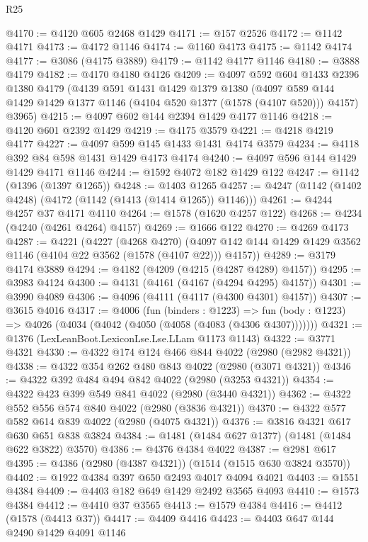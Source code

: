 \begin{lexlean}{R25}
\begin{coremodule}
@4170 := @4120 @605 @2468 @1429
@4171 := @157 @2526
@4172 := @1142 @4171
@4173 := @4172 @1146
@4174 := @1160 @4173
@4175 := @1142 @4174
@4177 := @3086 (@4175 @3889)
@4179 := @1142 @4177 @1146
@4180 := @3888 @4179
@4182 := @4170 @4180 @4126
@4209 := @4097
    @592
    @604
    @1433
    @2396
    @1380
    @4179
    (@4139
      @591
      @1431
      @1429
      @1379
      @1380
      (@4097 @589 @144 @1429 @1429 @1377 @1146 (@4104 @520 @1377 (@1578 (@4107 @520))) @4157)
      @3965)
@4215 := @4097 @602 @144 @2394 @1429 @4177 @1146
@4218 := @4120 @601 @2392 @1429
@4219 := @4175 @3579
@4221 := @4218 @4219 @4177
@4227 := @4097 @599 @145 @1433 @1431 @4174 @3579
@4234 := @4118 @392 @84 @598 @1431 @1429 @4173 @4174
@4240 := @4097 @596 @144 @1429 @1429 @4171 @1146
@4244 := @1592 @4072 @182 @1429 @122
@4247 := @1142 (@1396 (@1397 @1265))
@4248 := @1403 @1265
@4257 := @4247 (@1142 (@1402 @4248) (@4172 (@1142 (@1413 (@1414 @1265)) @1146)))
@4261 := @4244 @4257 @37 @4171 @4110
@4264 := @1578 (@1620 @4257 @122)
@4268 := @4234 (@4240 (@4261 @4264) @4157)
@4269 := @1666 @122
@4270 := @4269 @4173
@4287 := @4221
    (@4227
      (@4268 @4270)
      (@4097 @142 @144 @1429 @1429 @3562 @1146 (@4104 @22 @3562 (@1578 (@4107 @22))) @4157))
@4289 := @3179 @4174 @3889
@4294 := @4182 (@4209 (@4215 (@4287 @4289) @4157))
@4295 := @3983 @4124
@4300 := @4131 (@4161 (@4167 (@4294 @4295) @4157))
@4301 := @3990 @4089
@4306 := @4096 (@4111 (@4117 (@4300 @4301) @4157))
@4307 := @3615 @4016
@4317 := @4006
    (fun (binders : @1223) =>
    fun (body : @1223) => @4026 (@4034 (@4042 (@4050 (@4058 (@4083 (@4306 @4307)))))))
@4321 := @1376 (LexLeanBoot.LexiconLse.Lse.LLam @1173 @1143)
@4322 := @3771 @4321
@4330 := @4322 @174 @124 @466 @844 @4022 (@2980 (@2982 @4321))
@4338 := @4322 @354 @262 @480 @843 @4022 (@2980 (@3071 @4321))
@4346 := @4322 @392 @484 @494 @842 @4022 (@2980 (@3253 @4321))
@4354 := @4322 @423 @399 @549 @841 @4022 (@2980 (@3440 @4321))
@4362 := @4322 @552 @556 @574 @840 @4022 (@2980 (@3836 @4321))
@4370 := @4322 @577 @582 @614 @839 @4022 (@2980 (@4075 @4321))
@4376 := @3816 @4321 @617 @630 @651 @838 @3824
@4384 := @1481 (@1484 @627 @1377) (@1481 (@1484 @622 @3822) @3570)
@4386 := @4376 @4384 @4022
@4387 := @2981 @617
@4395 := @4386 (@2980 (@4387 @4321)) (@1514 (@1515 @630 @3824 @3570))
@4402 := @1922 @4384 @397 @650 @2493 @4017 @4094 @4021
@4403 := @1551 @4384
@4409 := @4403 @182 @649 @1429 @2492 @3565 @4093
@4410 := @1573 @4384
@4412 := @4410 @37 @3565
@4413 := @1579 @4384
@4416 := @4412 (@1578 (@4413 @37))
@4417 := @4409 @4416
@4423 := @4403 @647 @144 @2490 @1429 @4091 @1146

\end{coremodule}
\end{lexlean}

